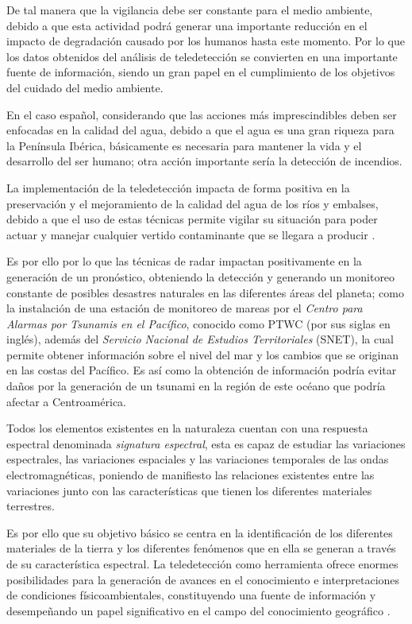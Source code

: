 De tal manera que la vigilancia debe ser constante para el medio ambiente, debido a que esta actividad podrá generar una importante reducción en el impacto de degradación causado por los humanos hasta este momento. Por lo que los datos obtenidos del análisis de teledetección se convierten en una importante fuente de información, siendo un gran papel en el cumplimiento de los objetivos del cuidado del medio ambiente.

En el caso español, considerando que las acciones más imprescindibles deben ser enfocadas en la calidad del agua, debido a que el agua es una gran riqueza para la Península Ibérica, básicamente es necesaria para mantener la vida y el desarrollo del ser humano; otra acción importante sería la detección de incendios.

La implementación de la teledetección impacta de forma positiva en la preservación y el mejoramiento de la calidad del agua de los ríos y embalses, debido a que el uso de estas técnicas permite vigilar su situación para poder actuar y manejar cualquier vertido contaminante que se llegara a producir \cite{Rosello2009}.

Es por ello por lo que las técnicas de radar impactan positivamente en la generación de un pronóstico, obteniendo la detección y generando un monitoreo constante de posibles desastres naturales en las diferentes áreas del planeta; como la instalación de una estación de monitoreo de mareas por el \textit{Centro para Alarmas por Tsunamis en el Pacífico}, conocido como PTWC (por sus siglas en inglés), además del \textit{Servicio Nacional de Estudios Territoriales} (SNET), la cual permite obtener información sobre el nivel del mar y los cambios que se originan en las costas del Pacífico. Es así como la obtención de información podría evitar daños por la generación de un tsunami en la región de este océano que podría afectar a Centroamérica.

Todos los elementos existentes en la naturaleza cuentan con una respuesta espectral denominada \textit{signatura espectral}, esta es capaz de estudiar las variaciones espectrales, las variaciones espaciales y las variaciones temporales de las ondas electromagnéticas, poniendo de manifiesto las relaciones existentes entre las variaciones junto con las características que tienen los diferentes materiales terrestres. 

Es por ello que su objetivo básico se centra en la identificación de los diferentes materiales de la tierra y los diferentes fenómenos que en ella se generan a través de su característica espectral. La teledetección como herramienta ofrece enormes posibilidades para la generación de avances en el conocimiento e interpretaciones de condiciones físicoambientales, constituyendo una fuente de información y desempeñando un papel significativo en el campo del conocimiento geográfico \cite{Botana2019}. 

